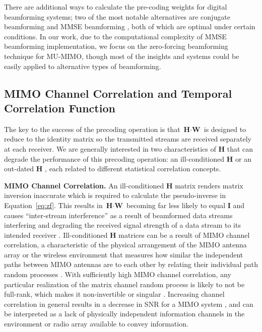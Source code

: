	There are additional ways to calculate the pre-coding weights for digital beamforming systems; two of the most notable alternatives are conjugate beamforming \cite{yang2013performance} and \ac{MMSE} beamforming \cite{joham2005linear}, both of which are optimal under certain conditions.
	In our work, due to the computational complexity of \ac{MMSE} beamforming implementation, we focus on the zero-forcing beamforming technique for \ac{MU-MIMO}, though most of the insights and systems could be easily applied to alternative types of beamforming.


\subsection{MIMO Channel Correlation and Temporal Correlation Function}
	The key to the success of the precoding operation is that $\textbf{H}\cdot \textbf{W}$ is designed to reduce to the identity matrix so the transmitted streams are received separately at each receiver.
	We are generally interested in two characteristics of $\textbf{H}$ that can degrade the performance of this precoding operation: an ill-conditioned $\textbf{H}$ \cite{zhong2011distribution} or an out-dated $\textbf{H}$ \cite{kaltenberger2008correlation}, each related to different statistical correlation concepts.

\textbf{MIMO Channel Correlation.}
	An ill-conditioned $\textbf{H}$ matrix renders matrix inversion inaccurate \cite{greenbaum2012numerical, peel2005vector} which is required to calculate the pseudo-inverse in Equation~\ref{eq:zf}.
	This results in $\textbf{H}\cdot \textbf{W}$ becoming far less likely to equal $\textbf{I}$ and causes ``inter-stream interference'' as a result of beamformed data streams interfering and degrading the received signal strength of a data stream to its intended receiver \cite{kaltenberger2008correlation}.
	Ill-conditioned $\textbf{H}$ matrices can be a result of \ac{MIMO} channel correlation, a characteristic of the physical arrangement of the \ac{MIMO} antenna array or the wireless environment that measures how similar the independent paths between \ac{MIMO} antennas are to each other by relating their individual path random processes \cite{loyka2001channel}.
	With sufficiently high \ac{MIMO} channel correlation, any particular realization of the matrix channel random process is likely to not be full-rank, which makes it non-invertible or singular \cite{peel2005vector}.
	Increasing channel correlation in general results in a decrease in \ac{SNR} for a \ac{MIMO} system \cite{loyka2001channel}, and can be interpreted as a lack of physically independent information channels in the environment or radio array available to convey information.

